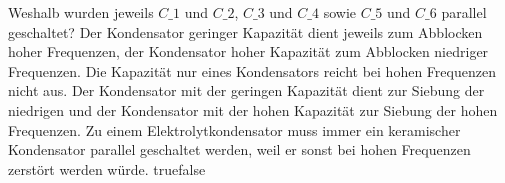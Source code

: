     {Weshalb wurden jeweils $C\_1$ und $C\_2$, $C\_3$ und $C\_4$ sowie $C\_5$ und $C\_6$ parallel geschaltet?}
    {Der Kondensator geringer Kapazität dient jeweils zum Abblocken hoher Frequenzen, der Kondensator hoher Kapazität zum Abblocken niedriger Frequenzen.}
    {Die Kapazität nur eines Kondensators reicht bei hohen Frequenzen nicht aus.}
    {Der Kondensator mit der geringen Kapazität dient zur Siebung der niedrigen und der Kondensator mit der hohen Kapazität zur Siebung der hohen Frequenzen.}
    {Zu einem Elektrolytkondensator muss immer ein keramischer Kondensator parallel geschaltet werden, weil er sonst bei hohen Frequenzen zerstört werden würde.}
    {true}{false}